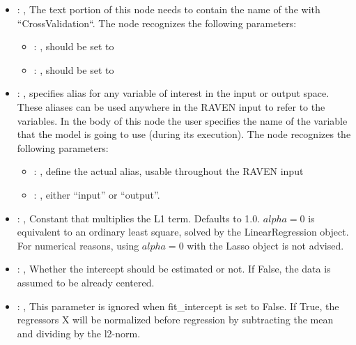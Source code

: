 \begin{itemize}
    \item {}: , 
      The text portion of this node needs to contain the name of the  with
               ``CrossValidation``.
      The  node recognizes the following parameters:
        \begin{itemize}
          \item {}: , 
            should be set to 
          \item {}: , 
            should be set to 
      \end{itemize}

    \item {}: , 
      specifies alias for         any variable of interest in the input or output space. These
      aliases can be used anywhere in the RAVEN input to         refer to the variables. In the body
      of this node the user specifies the name of the variable that the model is going to use
      (during its execution).
      The  node recognizes the following parameters:
        \begin{itemize}
          \item {}: , 
            define the actual alias, usable throughout the RAVEN input
          \item {}: , 
            either ``input'' or ``output''.
      \end{itemize}

    \item {}: , 
      Constant that multiplies the L1 term. Defaults to 1.0.
      $alpha = 0$ is equivalent to an ordinary least square, solved by
      the LinearRegression object. For numerical reasons, using $alpha = 0$
      with the Lasso object is not advised.

    \item {}: , 
      Whether the intercept should be estimated or not. If False,
      the data is assumed to be already centered.

    \item {}: , 
      This parameter is ignored when fit\_intercept is set to False. If True,
      the regressors X will be normalized before regression by subtracting the mean and
      dividing by the l2-norm.


\end{itemize}
